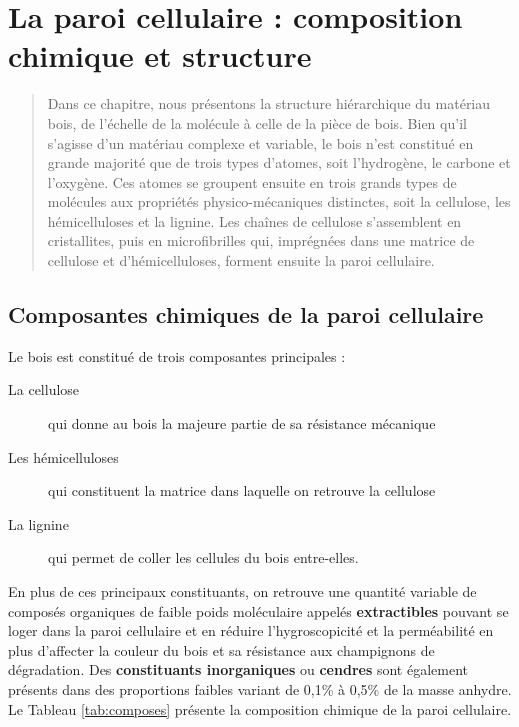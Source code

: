 \chapter{La paroi cellulaire : composition chimique et structure}\label{paroi}

\begin{abstract}
Dans ce chapitre, nous présentons la structure hiérarchique du matériau bois, de l'échelle de la molécule à celle de la pièce de bois. Bien qu'il s'agisse d'un matériau complexe et variable, le bois n'est constitué en grande majorité que de trois types d'atomes, soit l'hydrogène, le carbone et l'oxygène. Ces atomes se groupent ensuite en trois grands types de molécules aux propriétés physico-mécaniques distinctes, soit la cellulose, les hémicelluloses et la lignine. Les chaînes de cellulose s'assemblent en cristallites, puis en microfibrilles qui, imprégnées dans une matrice de cellulose et d'hémicelluloses, forment ensuite la paroi cellulaire.
\end{abstract}

\minitoc

\section{Composantes chimiques de la paroi cellulaire}

Le bois est constitué de trois composantes principales :

\begin{description}
\item[La cellulose] qui donne au bois la majeure partie de sa résistance mécanique
\item[Les hémicelluloses] qui constituent la matrice dans laquelle on retrouve la cellulose
\item[La lignine] qui permet de \og coller \fg les cellules du bois entre-elles. 
\end{description} 

En plus de ces principaux constituants, on retrouve une quantité variable de composés organiques de faible poids moléculaire appelés \textbf{extractibles} pouvant se loger dans la paroi cellulaire et en réduire l'hygroscopicité et la perméabilité en plus d'affecter la couleur du bois et sa résistance aux champignons de dégradation. Des \textbf{constituants inorganiques} ou \textbf{cendres} sont également présents dans des proportions faibles variant de 0,1\% à 0,5\% de la masse anhydre. Le Tableau \ref{tab:composes} présente la composition chimique de la paroi cellulaire.\\


